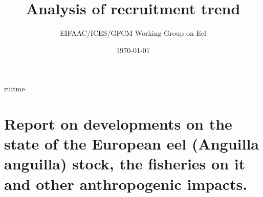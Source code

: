 ruitme\documentclass[pdftex,11pt,a4paper]{report}
\begin{document}


\title{ Analysis of recruitment trend}
\author{EIFAAC/ICES/GFCM Working Group on Eel}
\date\today
\maketitle
\newpage
\tableofcontents
\subsection*{}
\addtocounter{chapter}{1}
\chapter{Report on developments on the state of the European eel (Anguilla
anguilla) stock, the fisheries on it and other anthropogenic impacts.}





\end{document}
